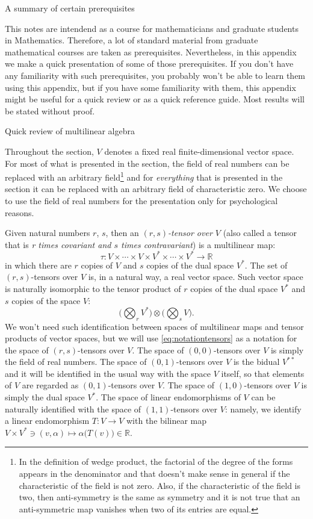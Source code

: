 \documentclass[oneside,a4paper,11pt]{amsbook}
\newcommand{\R}{\mathds R}
\theoremstyle{remark}\newtheorem{exercise}{Exercise}[chapter]
\theoremstyle{plain}\newtheorem{teo}{Theorem}[section]
\theoremstyle{plain}\newtheorem{lem}[teo]{Lemma}
\theoremstyle{plain}\newtheorem{prop}[teo]{Proposition}
\theoremstyle{plain}\newtheorem{cor}[teo]{Corollary}
\theoremstyle{definition}\newtheorem{defin}[teo]{Definition}
\theoremstyle{remark}\newtheorem{rem}[teo]{Remark}
\theoremstyle{definition}\newtheorem{notation}[teo]{Notation}
\theoremstyle{definition}\newtheorem{convention}[teo]{Convention}
\theoremstyle{definition}\newtheorem{example}[teo]{Example}
\numberwithin{section}{chapter}
\numberwithin{equation}{section}
\begin{document}
\begin{chapter}{A summary of certain prerequisites}

This notes are intendend as a course for mathematicians and graduate students in Mathematics. Therefore, a lot of standard material from graduate mathematical
courses are taken as prerequisites. Nevertheless, in this appendix we make a quick presentation of some of those prerequisites. If you don't have any familiarity
with such prerequisites, you probably won't be able to learn them using this appendix, but if you have some familiarity with them, this appendix might be useful
for a quick review or as a quick reference guide. Most results will be stated without proof.

\begin{section}{Quick review of multilinear algebra}\label{sec:quickmultilinear}

Throughout the section, $V$ denotes a fixed real finite-dimensional vector space. For most of what is presented in the section, the field of real numbers
can be replaced with an arbitrary field\footnote{%
In the definition of wedge product, the factorial of the degree of the forms appears in the denominator and that doesn't make sense in general if the characteristic of the
field is not zero. Also, if the characteristic of the field is two, then anti-symmetry is the same as symmetry and it is not true that an anti-symmetric map vanishes
when two of its entries are equal.} and for {\em everything\/} that is presented in the section it can be replaced with an arbitrary field of characteristic zero.
We choose to use the field of real numbers for the presentation only for psychological reasons.

Given natural numbers $r$, $s$, then an {\em $(r,s)$-tensor over $V$\/}
(also called a tensor that is {\em r times covariant and $s$ times contravariant}) is a multilinear map:
\[\tau:V\times\cdots\times V\times V^*\times\cdots\times V^*\longrightarrow\R\]
in which there are $r$ copies of $V$ and $s$ copies of the dual space $V^*$.
The set of $(r,s)$-tensors over $V$ is, in a natural way, a real
vector space. Such vector space is naturally isomorphic to the tensor product of $r$ copies of the dual space $V^*$ and $s$ copies of the space $V$:
\begin{equation}\label{eq:notationtensors}
\Big(\bigotimes_rV^*\Big)\otimes\Big(\bigotimes_sV\Big).
\end{equation}
We won't need such identification between spaces of multilinear maps and tensor products of vector spaces, but we will use \eqref{eq:notationtensors}
as a notation for the space of $(r,s)$-tensors over $V$. The space of $(0,0)$-tensors over $V$
is simply the field of real numbers. The space of $(0,1)$-tensors over $V$ is the bidual $V^{**}$ and it will be identified in the usual way with the space $V$
itself, so that elements of $V$ are regarded as $(0,1)$-tensors over $V$. The space of $(1,0)$-tensors over $V$ is simply the dual space $V^*$.
The space of linear endomorphisms of $V$ can be naturally identified with the space of $(1,1)$-tensors over $V$: namely, we identify a linear endomorphism
$T:V\to V$ with the bilinear map $V\times V^*\ni(v,\alpha)\mapsto\alpha\big(T(v)\big)\in\R$.


\end{section}
\end{chapter}
\end{document}
